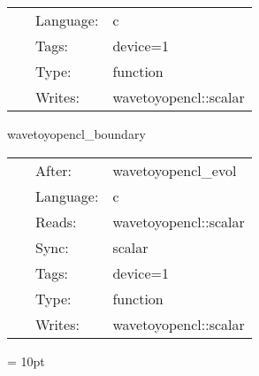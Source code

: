 \hspace{5mm}{\it evolve scalar wave } 


\hspace{5mm}

 \begin{tabular*}{160mm}{cll} 
~ & Language:  & c \\ 
~ & Tags:  & device=1 \\ 
~ & Type:  & function \\ 
~ & Writes:  & wavetoyopencl::scalar \\ 
\end{tabular*} 


\vspace{5mm}


\hspace{5mm} wavetoyopencl\_boundary 

\hspace{5mm}{\it boundary conditions for scalar wave } 


\hspace{5mm}

 \begin{tabular*}{160mm}{cll} 
~ & After:  & wavetoyopencl\_evol \\ 
~ & Language:  & c \\ 
~ & Reads:  & wavetoyopencl::scalar \\ 
~ & Sync:  & scalar \\ 
~ & Tags:  & device=1 \\ 
~ & Type:  & function \\ 
~ & Writes:  & wavetoyopencl::scalar \\ 
\end{tabular*} 



\vspace{5mm}\parskip = 10pt 

